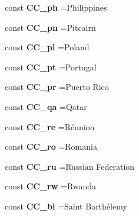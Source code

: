 \begin{DoxyCompactItemize}
const {\bfseries C\+C\+\_\+ph} =\textquotesingle{}Philippines\textquotesingle{}
\item 
\hypertarget{class_i_s_o_a5fb6a199b1fe545e86b2fd6581c467b2}{}\label{class_i_s_o_a5fb6a199b1fe545e86b2fd6581c467b2} 
const {\bfseries C\+C\+\_\+pn} =\textquotesingle{}Pitcairn\textquotesingle{}
\item 
\hypertarget{class_i_s_o_af67f76f12d22d4b5b28fafe5ac00eef0}{}\label{class_i_s_o_af67f76f12d22d4b5b28fafe5ac00eef0} 
const {\bfseries C\+C\+\_\+pl} =\textquotesingle{}Poland\textquotesingle{}
\item 
\hypertarget{class_i_s_o_ab9f00653b9979af31e76c38031f0e676}{}\label{class_i_s_o_ab9f00653b9979af31e76c38031f0e676} 
const {\bfseries C\+C\+\_\+pt} =\textquotesingle{}Portugal\textquotesingle{}
\item 
\hypertarget{class_i_s_o_a10972548a99ecff0cab9caf3d384a660}{}\label{class_i_s_o_a10972548a99ecff0cab9caf3d384a660} 
const {\bfseries C\+C\+\_\+pr} =\textquotesingle{}Puerto Rico\textquotesingle{}
\item 
\hypertarget{class_i_s_o_afb0d95b999d49454aeba03f2c1746ad2}{}\label{class_i_s_o_afb0d95b999d49454aeba03f2c1746ad2} 
const {\bfseries C\+C\+\_\+qa} =\textquotesingle{}Qatar\textquotesingle{}
\item 
\hypertarget{class_i_s_o_aafca3ae97720557308580dd8661b328b}{}\label{class_i_s_o_aafca3ae97720557308580dd8661b328b} 
const {\bfseries C\+C\+\_\+re} =\textquotesingle{}Réunion\textquotesingle{}
\item 
\hypertarget{class_i_s_o_a1098495fdfa9f675318d8b3e47151fd0}{}\label{class_i_s_o_a1098495fdfa9f675318d8b3e47151fd0} 
const {\bfseries C\+C\+\_\+ro} =\textquotesingle{}Romania\textquotesingle{}
\item 
\hypertarget{class_i_s_o_a09d838ee25d7967e6bd60045a891e3fc}{}\label{class_i_s_o_a09d838ee25d7967e6bd60045a891e3fc} 
const {\bfseries C\+C\+\_\+ru} =\textquotesingle{}Russian Federation\textquotesingle{}
\item 
\hypertarget{class_i_s_o_ac26771b107ea0a7774cc290a83b5adc8}{}\label{class_i_s_o_ac26771b107ea0a7774cc290a83b5adc8} 
const {\bfseries C\+C\+\_\+rw} =\textquotesingle{}Rwanda\textquotesingle{}
\item 
\hypertarget{class_i_s_o_a08266c69edb4e4a38e37eb4ea80f4e80}{}\label{class_i_s_o_a08266c69edb4e4a38e37eb4ea80f4e80} 
const {\bfseries C\+C\+\_\+bl} =\textquotesingle{}Saint Barthélemy\textquotesingle{}
\item 
\hypertarget{class_i_s_o_acd7f42fc56da203f9aa39a2500ab3605}{}\label{class_i_s_o_acd7f42fc56da203f9aa39a2500ab3605} 

\end{DoxyCompactItemize}
